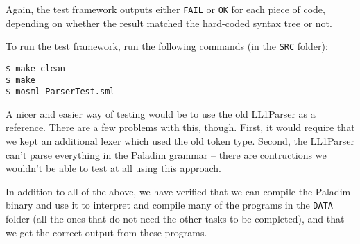 \documentclass{article}
\begin{document}
Again, the test framework outputs either \texttt{FAIL} or \texttt{OK} for each piece of code,
depending on whether the result matched the hard-coded syntax tree or not.

To run the test framework, run the following commands (in the \texttt{SRC} folder):

\begin{verbatim}
$ make clean
$ make
$ mosml ParserTest.sml
\end{verbatim}

A nicer and easier way of testing would be to use the old LL1Parser as a reference. There are
a few problems with this, though. First, it would require that we kept an additional lexer
which used the old token type. Second, the LL1Parser can't parse everything in the Paladim
grammar -- there are contructions we wouldn't be able to test at all using this approach.

In addition to all of the above, we have verified that we can compile the Paladim binary and
use it to interpret and compile many of the programs in the \texttt{DATA} folder (all the
ones that do not need the other tasks to be completed), and that we get the correct output
from these programs.
\end{document}
